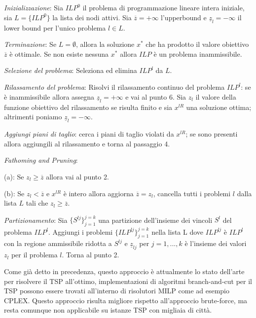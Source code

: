 \documentclass[a4paper,12pt]{report}
\begin{document}
\begin{tcolorbox}[colframe=black,colback=white,boxrule=0.5pt, sharp corners]
\begin{legal}
  \item \textit{Inizializzazione}: Sia $ILP^0$ il problema di programmazione lineare intera iniziale, sia $L = \{ILP^0\}$ la lista dei nodi attivi. Sia $\overline{z} = +\infty$ l'upperbound e $\underline{z}_l = -\infty$ il lower bound per l'unico problema $l \in L$.
  \item \textit{Terminazione}: Se $L = \emptyset$, allora la soluzione $x^*$ che ha prodotto il valore obiettivo $\overline{z}$ è ottimale. Se non esiste nessuna $x^*$ allora $ILP$ è un problema inammissibile.
  \item \textit{Selezione del problema}: Seleziona ed elimina $ILP^l$ da $L$.
  \item \textit{Rilassamento del problema}: Risolvi il rilassamento continuo del problema $ILP^l$: se è inammissibile allora assegna $\underline{z}_l = +\infty$ e vai al punto 6. Sia $z_l$ il valore della funzione obiettivo del rilassamento se risulta finito e sia $x^{lR}$ una soluzione ottima; altrimenti poniamo $\underline{z}_l = -\infty$.
  \item \textit{Aggiungi piani di taglio}: cerca i piani di taglio violati da $x^{lR}$; se sono presenti allora aggiungili al rilassamento e torna al passaggio 4.
  \item \textit{Fathoming and Pruning}:
  \begin{legal}
    \item (a): Se $z_l \geq \overline{z}$ allora vai al punto 2.
    \item (b): Se $z_l < \overline{z}$ e $x^{lR}$ è intero allora aggiorna $\overline{z} = z_l$, cancella tutti i problemi $l$ dalla lista $L$ tali che $z_l \geq \overline{z}$.
  \end{legal}
  \item \textit{Partizionamento}: Sia $\{S^{lj}\}^{j=k}_{j=1}$ una partizione dell'insieme dei vincoli $S^l$ del problema $ILP^l$. Aggiungi i problemi $\{ILP^{lj}\}^{j=k}_{j=1}$ nella lista L dove $ILP^{lj}$ è $ILP^l$ con la regione ammissibile ridotta a $S^{lj}$ e ${\underline{z}}_{lj}$ per $j = 1, ..., k$ è l'insieme dei valori $z_l$ per il problema $l$. Torna al punto 2.

\end{legal}
\end{tcolorbox}
\hfill \break
Come già detto in precedenza, questo approccio è attualmente lo stato dell'arte per risolvere il TSP all'ottimo, implementazioni di algoritmi branch-and-cut per il TSP possono essere trovati all'interno di risolutori MILP come ad esempio CPLEX. Questo approccio risulta migliore rispetto all'approccio brute-force, ma resta comunque non applicabile su istanze TSP con migliaia di città.
\end{document}
